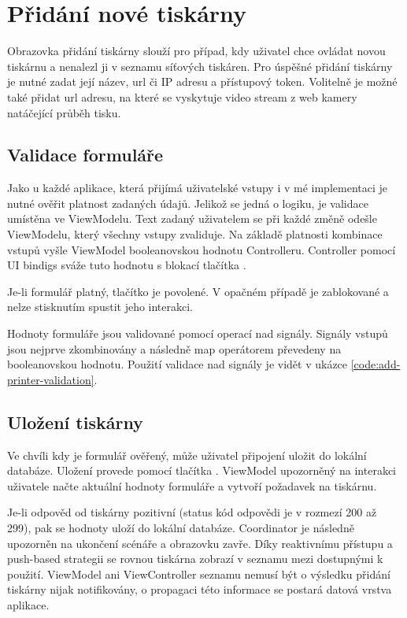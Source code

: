 \section{Přidání nové tiskárny}

Obrazovka přidání tiskárny slouží pro případ, kdy uživatel chce ovládat novou tiskárnu a nenalezl ji v seznamu síťových tiskáren.
Pro úspěšné přidání tiskárny je nutné zadat její název, \acrshort{url} či IP adresu a přístupový token.
Volitelně je možné také přidat url adresu, na které se vyskytuje video stream z web kamery natáčející průběh tisku.

\subsection{Validace formuláře}

Jako u každé aplikace, která přijímá uživatelské vstupy i v mé implementaci je nutné ověřit platnost zadaných údajů.
Jelikož se jedná o logiku, je validace umístěna ve ViewModelu.
Text zadaný uživatelem se při každé změně odešle ViewModelu, který všechny vstupy zvaliduje.
Na základě platnosti kombinace vstupů vyšle ViewModel booleanovskou hodnotu Controlleru.
Controller pomocí UI bindigs sváže tuto hodnotu s blokací tlačítka . 

Je-li formulář platný, tlačítko je povolené.
V opačném případě je zablokované a nelze stisknutím spustit jeho interakci.

Hodnoty formuláře jsou validované pomocí operací nad signály.
Signály vstupů jsou nejprve zkombinovány a následně map operátorem převedeny na booleanovskou hodnotu.
Použití validace nad signály je vidět v ukázce \ref{code:add-printer-validation}.


\subsection{Uložení tiskárny}

Ve chvíli kdy je formulář ověřený, může uživatel připojení uložit do lokální databáze.
Uložení provede pomocí tlačítka .
ViewModel upozorněný na interakci uživatele načte aktuální hodnoty formuláře a vytvoří požadavek na tiskárnu.

Je-li odpověd od tiskárny pozitivní (status kód odpovědi je v rozmezí 200 až 299), pak se hodnoty uloží do lokální databáze.
Coordinator je následně upozorněn na ukončení scénáře a obrazovku zavře.
Díky reaktivnímu přístupu a push-based strategii se rovnou tiskárna zobrazí v seznamu mezi dostupnými k použití.
ViewModel ani ViewController seznamu nemusí být o výsledku přidání tiskárny nijak notifikovány, o propagaci této informace se postará datová vrstva aplikace.

